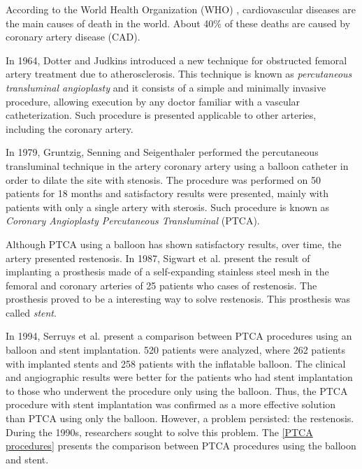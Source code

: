 According to the World Health Organization (WHO) \cite{oms},
cardiovascular diseases are the main
causes of death in the world. About 40\% of these
deaths are caused by coronary artery disease (CAD).

\medskip
In 1964, Dotter and Judkins \cite{dotter1964} 
introduced a new technique for obstructed femoral artery treatment
 due to atherosclerosis. This technique is
known as \textit{percutaneous transluminal angioplasty} and
 it consists of a simple and minimally invasive procedure,
 allowing execution by any doctor familiar with a vascular
 catheterization. Such procedure is presented applicable to
 other arteries, including the coronary artery.


\medskip
In 1979, Gruntzig, Senning and Seigenthaler \cite{gruntzig1979}
 performed the percutaneous transluminal technique in the artery
coronary artery using a balloon catheter in order to dilate the site
with stenosis. 
The procedure was performed on 50 patients for 18 months and
satisfactory results were presented, mainly with patients with only
a single artery with sterosis. 
Such procedure is known as \textit{Coronary Angioplasty
Percutaneous Transluminal} (PTCA).

\medskip
Although PTCA using a balloon has shown satisfactory results,
over time, the artery presented restenosis. 
In 1987, Sigwart et al. \cite{sigwart1987}
present the result of implanting a prosthesis made of a 
self-expanding stainless steel mesh in the femoral and 
coronary arteries of 25 patients who cases of restenosis. 
The prosthesis proved to be a
interesting way to solve restenosis. 
This prosthesis was called \textit{stent}.


\medskip
In 1994, Serruys et al. \cite{serruys1994} present a comparison between PTCA procedures
using an balloon and stent implantation. 520 patients were analyzed,
where 262 patients with implanted stents and 258 patients with the
inflatable balloon. The clinical and angiographic results were better for the patients who had stent implantation to those who underwent the procedure only
using the balloon. Thus, the PTCA procedure with stent implantation
was confirmed as a more effective solution than PTCA using only the balloon.
However, a problem persisted: the restenosis. 
During the 1990s, researchers
sought to solve this problem. The \ref{PTCA procedures} presents the comparison between
PTCA procedures using the balloon and stent.

